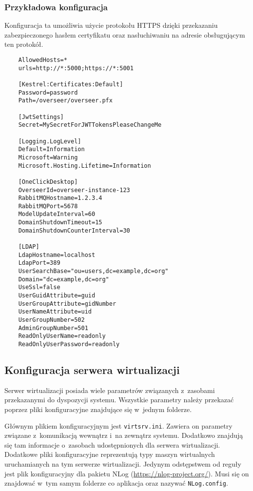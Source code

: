 \documentclass[../opis-rozwiazania.tex]{subfiles}
\begin{document}
\subsubsection{Przykładowa konfiguracja}

Konfiguracja ta umożliwia użycie protokołu HTTPS dzięki przekazaniu zabezpieczonego hasłem certyfikatu oraz nasłuchiwaniu na adresie obsługującym ten protokół.

\begin{verbatim}
	AllowedHosts=*
	urls=http://*:5000;https://*:5001

	[Kestrel:Certificates:Default]
	Password=password
	Path=/overseer/overseer.pfx

	[JwtSettings]
	Secret=MySecretForJWTTokensPleaseChangeMe

	[Logging.LogLevel]
	Default=Information
	Microsoft=Warning
	Microsoft.Hosting.Lifetime=Information

	[OneClickDesktop]
	OverseerId=overseer-instance-123
	RabbitMQHostname=1.2.3.4
	RabbitMQPort=5678
	ModelUpdateInterval=60
	DomainShutdownTimeout=15
	DomainShutdownCounterInterval=30

	[LDAP]
	LdapHostname=localhost
	LdapPort=389
	UserSearchBase="ou=users,dc=example,dc=org"
	Domain="dc=example,dc=org"
	UseSsl=false
	UserGuidAttribute=guid
	UserGroupAttribute=gidNumber
	UserNameAttribute=uid
	UserGroupNumber=502
	AdminGroupNumber=501
	ReadOnlyUserName=readonly
	ReadOnlyUserPassword=readonly
\end{verbatim}

\subsection{Konfiguracja serwera wirtualizacji}
\label{system_startup.virtsrv_conf}
Serwer wirtualizacji posiada wiele parametrów związanych z~zasobami przekazanymi do dyspozycji systemu.
Wszystkie parametry należy przekazać poprzez pliki konfiguracyjne znajdujące się w~jednym folderze.

Głównym plikiem konfiguracyjnym jest \texttt{virtsrv.ini}.
Zawiera on parametry związane z~komunikacją wewnątrz i~na zewnątrz systemu.
Dodatkowo znajdują się tam informacje o~zasobach udostępnionych dla serwera wirtualizacji.
Dodatkowe pliki konfiguracyjne reprezentują typy maszyn wirtualnych uruchamianych na tym serwerze wirtualizacji.
Jedynym odstępstwem od reguły jest plik konfiguracyjny dla pakietu NLog (\url{https://nlog-project.org/}).
Musi się on znajdować w~tym samym folderze co aplikacja oraz nazywać \texttt{NLog.config}.
\end{document}
